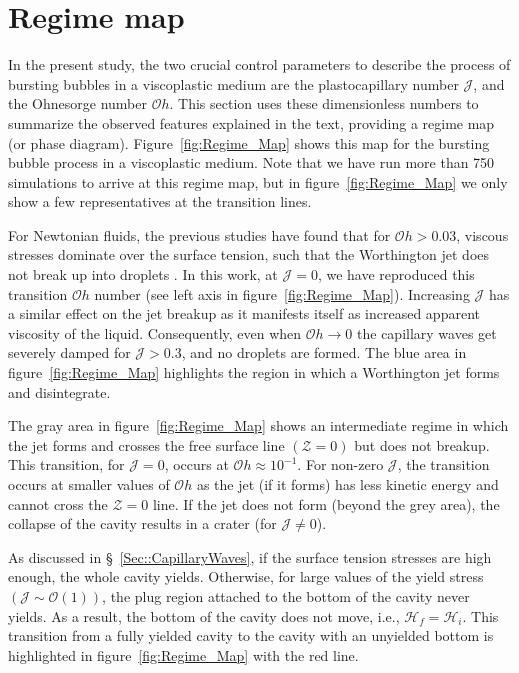 \documentclass[final]{jfm}
\begin{document}
\section{Regime map}\label{Sec::RegimeMaps}
In the present study, the two crucial control parameters to describe the process of bursting bubbles in a viscoplastic medium are the plastocapillary number $\mathcal{J}$, and the Ohnesorge number $\mathcal{O}h$. This section uses these dimensionless numbers to summarize the observed features explained in the text, providing a regime map (or phase diagram). Figure~\ref{fig:Regime_Map} shows this map for the bursting bubble process in a viscoplastic medium. Note that we have run more than 750 simulations to arrive at this regime map, but in figure~\ref{fig:Regime_Map} we only show a few representatives at the transition lines.

For Newtonian fluids, the previous studies have found that for $\mathcal{O}h > 0.03$, viscous stresses dominate over the surface tension, such that the Worthington jet does not break up into droplets \citep{san2011size, ghabache2014physics, walls2015jet}. In this work, at $\mathcal{J} = 0$, we have reproduced this transition $\mathcal{O}h$ number (see left axis in figure~\ref{fig:Regime_Map}). Increasing $\mathcal{J}$ has a similar effect on the jet breakup as it manifests itself as increased apparent viscosity of the liquid. Consequently, even when $\mathcal{O}h \to 0$ the capillary waves get severely damped for $\mathcal{J} > 0.3$, and no droplets are formed. The blue area in figure~\ref{fig:Regime_Map} highlights the region in which a Worthington jet forms and disintegrate. 

The gray area in figure~\ref{fig:Regime_Map} shows an intermediate regime in which the jet forms  and crosses the free surface line $\left(\mathcal{Z} = 0\right)$ but does not breakup. This transition, for $\mathcal{J} = 0$, occurs at $\mathcal{O}h \approx 10^{-1}$. For non-zero $\mathcal{J}$, the transition occurs at smaller values of $\mathcal{O}h$  as the jet (if it forms) has less kinetic energy and cannot cross the $\mathcal{Z} = 0$ line. If the jet does not form (beyond the grey area), the collapse of the cavity results in a crater (for $\mathcal{J} \ne 0$). 

As discussed in \S~\ref{Sec::CapillaryWaves}, if the surface tension stresses are high enough, the whole cavity yields. Otherwise, for large values of the yield stress $\left(\mathcal{J} \sim \mathcal{O}\left(1\right)\right)$, the plug region attached to the bottom of the cavity never yields. As a result, the bottom of the cavity does not move, i.e., $\mathcal{H}_f = \mathcal{H}_i$. This transition from a fully yielded cavity to the cavity with an unyielded bottom is highlighted in figure~\ref{fig:Regime_Map} with the red line.
\end{document}
